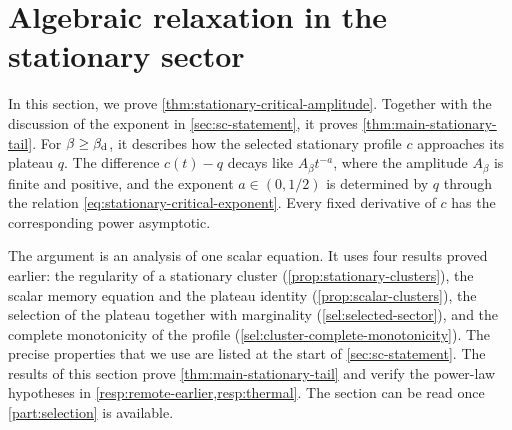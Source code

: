 \chapter{Algebraic relaxation in the stationary sector}\label{sec:stationary-relaxation}

In this section, we prove \cref{thm:stationary-critical-amplitude}. Together with the discussion of the exponent in \cref{sec:sc-statement}, it proves \cref{thm:main-stationary-tail}. For $\beta\ge\beta_{\mathrm d}$, it describes how the selected stationary profile $c$ approaches its plateau $q$. The difference $c(t)-q$ decays like $A_\beta t^{-a}$, where the amplitude $A_\beta$ is finite and positive, and the exponent $a\in(0,1/2)$ is determined by $q$ through the relation \eqref{eq:stationary-critical-exponent}. Every fixed derivative of $c$ has the corresponding power asymptotic.

The argument is an analysis of one scalar equation. It uses four results proved earlier: the regularity of a stationary cluster (\cref{prop:stationary-clusters}), the scalar memory equation and the plateau identity (\cref{prop:scalar-clusters}), the selection of the plateau together with marginality (\cref{sel:selected-sector}), and the complete monotonicity of the profile (\cref{sel:cluster-complete-monotonicity}). The precise properties that we use are listed at the start of \cref{sec:sc-statement}. The results of this section prove \cref{thm:main-stationary-tail} and verify the power-law hypotheses in \cref{resp:remote-earlier,resp:thermal}. The section can be read once \cref{part:selection} is available.

